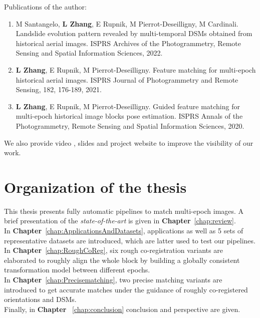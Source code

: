 \par
Publications of the author:
\begin{enumerate}
	\item M Santangelo, \textbf{L Zhang}, E Rupnik, M Pierrot-Deseilligny, M Cardinali. Landslide evolution pattern revealed by multi-temporal DSMs obtained from historical aerial images. ISPRS Archives of the Photogrammetry, Remote Sensing and Spatial Information Sciences, 2022.
	\item \textbf{L Zhang}, E Rupnik, M Pierrot-Deseilligny. Feature matching for multi-epoch historical aerial images. ISPRS Journal of Photogrammetry and Remote Sensing, 182, 176-189, 2021.
	\item \textbf{L Zhang}, E Rupnik, M Pierrot-Deseilligny.	Guided feature matching for multi-epoch historical image blocks pose estimation. ISPRS Annals of the Photogrammetry, Remote Sensing and Spatial Information Sciences, 2020.
\end{enumerate}
We also provide video \cite{HistoPVideo}, slides \cite{HistoPSlides} and project website \cite{HistoPProj} to improve the visibility of our work.

\section{Organization of the thesis}
This thesis presents fully automatic pipelines to match multi-epoch images.
A brief presentation of the \textit{state-of-the-art} is given in \textbf{Chapter}~\ref{chap:review}. \\

In \textbf{Chapter}~\ref{chap:ApplicationsAndDatasets}, applications as well as 5 sets of representative datasets are introduced, which are latter used to test our pipelines.\\

In \textbf{Chapter}~\ref{chap:RoughCoReg}, six rough co-registration variants are elaborated to roughly align the whole block by building a globally consistent transformation model between different epochs.\\

In \textbf{Chapter}~\ref{chap:Precisematching}, two precise matching variants are introduced to get accurate matches under the guidance of roughly co-registered orientations and \ac{DSM}s.\\

Finally, in \textbf{Chapter} ~\ref{chap:conclusion} conclusion and perspective are given.\\

